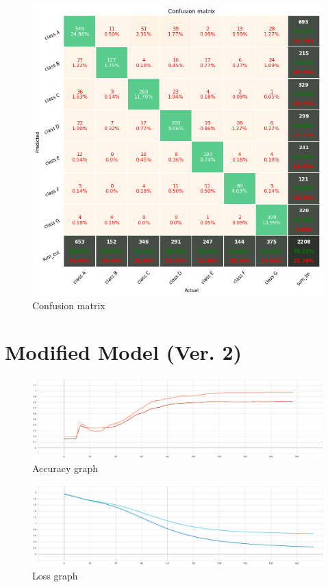 \begin{figure}[htbp]
\centering
\includegraphics[width=0.6\linewidth]{results/fig/confusion1.png}
\caption{Confusion matrix}
\label{fig:confusion1}
\end{figure}

\newpage
\section{Modified Model (Ver. 2)}

\begin{figure}[htbp]
\centering
\includegraphics[width=0.7\linewidth]{results/fig/Accuracy2.png}
\caption{Accuracy graph}
\label{fig:accuracy2}
\end{figure}

\begin{figure}[htbp]
\centering
\includegraphics[width=0.7\linewidth]{results/fig/Loss2.png}
\caption{Loss graph}
\label{fig:evaluation2}
\end{figure}

